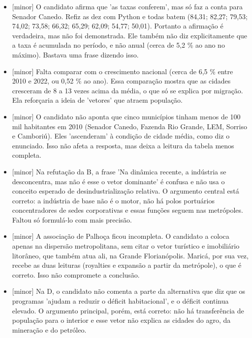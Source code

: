 \documentclass{article}%
\begin{document}
\begin{itemize}%
\item%
{[}minor{]} O candidato afirma que 'as taxas conferem', mas só faz a conta para Senador Canedo. Refiz as dez com Python e todas batem (84,31; 82,27; 79,53; 74,02; 73,58; 66,32; 65,29; 62,09; 54,77; 50,01). Portanto a afirmação é verdadeira, mas não foi demonstrada. Ele também não diz explicitamente que a taxa é acumulada no período, e não anual (cerca de 5,2 \% ao ano no máximo). Bastava uma frase dizendo isso.%
\item%
{[}minor{]} Falta comparar com o crescimento nacional (cerca de 6,5 \% entre 2010 e 2022, ou 0,52 \% ao ano). Essa comparação mostra que as cidades cresceram de 8 a 13 vezes acima da média, o que só se explica por migração. Ela reforçaria a ideia de 'vetores' que atraem população.%
\item%
{[}minor{]} O candidato não aponta que cinco municípios tinham menos de 100 mil habitantes em 2010 (Senador Canedo, Fazenda Rio Grande, LEM, Sorriso e Camboriú). Eles 'ascenderam' à condição de cidade média, como diz o enunciado. Isso não afeta a resposta, mas deixa a leitura da tabela menos completa.%
\item%
{[}minor{]} Na refutação da B, a frase 'Na dinâmica recente, a indústria se desconcentra, mas não é esse o vetor dominante' é confusa e não usa o conceito esperado de desindustrialização relativa. O argumento central está correto: a indústria de base não é o motor, não há polos portuários concentradores de sedes corporativas e essas funções seguem nas metrópoles. Faltou só formulá{-}lo com mais precisão.%
\item%
{[}minor{]} A associação de Palhoça ficou incompleta. O candidato a coloca apenas na dispersão metropolitana, sem citar o vetor turístico e imobiliário litorâneo, que também atua ali, na Grande Florianópolis. Maricá, por sua vez, recebe as duas leituras (royalties e expansão a partir da metrópole), o que é correto. Isso não compromete a conclusão.%
\item%
{[}minor{]} Na D, o candidato não comenta a parte da alternativa que diz que os programas 'ajudam a reduzir o déficit habitacional', e o déficit continua elevado. O argumento principal, porém, está correto: não há transferência de população para o interior e esse vetor não explica as cidades do agro, da mineração e do petróleo.%
\end{itemize}%
\end{document}
